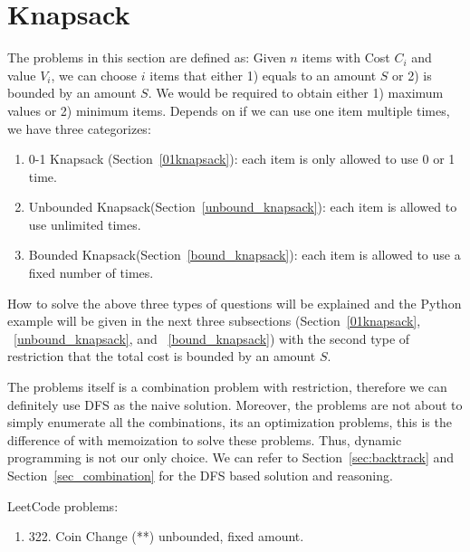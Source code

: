 \documentclass[../main.tex]{subfiles}
\begin{document}
\section{Knapsack}
The problems in this section are defined as: Given $n$ items with Cost $C_i$ and value $V_i$, we can choose $i$ items that either 1) equals to an amount $S$ or 2) is bounded by an amount $S$. We would be required to obtain either 1) maximum values or 2) minimum items. Depends on if we can use one item multiple times, we have three categorizes: 
\begin{enumerate}
    \item 0-1 Knapsack (Section~\ref{01knapsack}): each item is only allowed to use 0 or 1 time.
    \item Unbounded Knapsack(Section~\ref{unbound_knapsack}): each item is allowed to use unlimited times. 
    \item Bounded Knapsack(Section~\ref{bound_knapsack}): each item is allowed to use a fixed number of times. 
\end{enumerate}

How to solve the above three types of questions will be explained and the Python example will be given in the next three subsections (Section~\ref{01knapsack}, ~\ref{unbound_knapsack}, and ~\ref{bound_knapsack}) with the second type of restriction that the total cost is bounded by an amount $S$. 

The problems itself is a combination problem with restriction, therefore we can definitely use DFS as the naive solution. Moreover, the problems are not about to simply enumerate all the combinations, its an optimization problems, this is the difference of  with memoization to solve these problems. Thus, dynamic programming is not our only choice. We can refer to Section~\ref{sec:backtrack} and Section~\ref{sec_combination} for the DFS based solution and reasoning. 

LeetCode problems:
\begin{enumerate}
    \item 322. Coin Change (**) unbounded, fixed amount. 
\end{enumerate}




\end{document}
